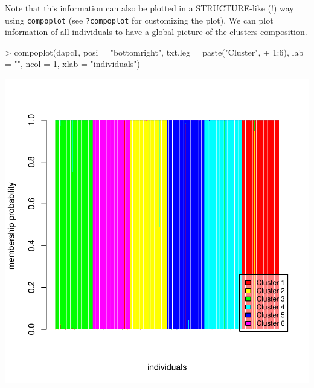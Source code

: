 \documentclass{article}
\newcommand{\code}[1]{{{\tt #1}}}
\begin{document}
Note that this information can also be plotted in a STRUCTURE-like (!) way using \texttt{compoplot}
(see \code{?compoplot} for customizing the plot).
We can plot information of all individuals to have a global picture of the clusters composition.
\begin{Schunk}
\begin{Sinput}
> compoplot(dapc1, posi = "bottomright", txt.leg = paste("Cluster", 
+     1:6), lab = "", ncol = 1, xlab = "individuals")
\end{Sinput}
\end{Schunk}
\includegraphics{figs/dapc-023}
\end{document}
